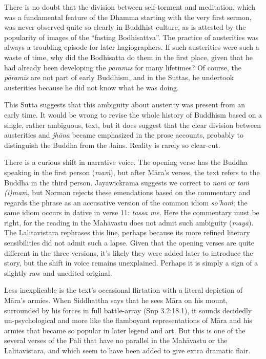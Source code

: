 \documentclass[12pt,openany]{book}%
\begin{document}
There is no doubt that the division between self-torment and meditation, which was a fundamental feature of the Dhamma starting with the very first sermon, was never observed quite so clearly in Buddhist culture, as is attested by the popularity of images of the “fasting Bodhisattva”. The practice of austerities was always a troubling episode for later hagiographers. If such austerities were such a waste of time, why did the Bodhisatta do them in the first place, given that he had already been developing the \textit{\textsanskrit{pāramīs}} for many lifetimes? Of course, the \textit{\textsanskrit{pāramīs}} are not part of early Buddhism, and in the Suttas, he undertook austerities because he did not know what he was doing.

This Sutta suggests that this ambiguity about austerity was present from an early time. It would be wrong to revise the whole history of Buddhism based on a single, rather ambiguous, text, but it does suggest that the clear division between austerities and \textit{\textsanskrit{jhāna}} became emphasized in the prose accounts, probably to distinguish the Buddha from the Jains. Reality is rarely so clear-cut.

There is a curious shift in narrative voice. The opening verse has the Buddha speaking in the first person (\textit{\textsanskrit{maṁ}}), but after \textsanskrit{Māra}’s verses, the text refers to the Buddha in the third person. Jayawickrama suggests we correct to \textit{\textsanskrit{naṁ}} or \textit{\textsanskrit{taṁ} (i)\textsanskrit{maṁ}}, but Norman rejects these emendations based on the commentary and regards the phrase as an accusative version of the common idiom \textit{so’\textsanskrit{haṁ}}; the same idiom occurs in dative in verse 11: \textit{tassa me}. Here the commentary must be right, for the reading in the \textsanskrit{Mahāvastu} does not admit such ambiguity (\textit{\textsanskrit{mayā}}). The Lalitavistara rephrases this line, perhaps because its more refined literary sensibilities did not admit such a lapse. Given that the opening verses are quite different in the three versions, it’s likely they were added later to introduce the story, but the shift in voice remains unexplained. Perhaps it is simply a sign of a slightly raw and unedited original.

Less inexplicable is the text’s occasional flirtation with a literal depiction of \textsanskrit{Māra}’s armies. When Siddhattha says that he sees \textsanskrit{Māra} on his mount, surrounded by his forces in full battle-array (Snp 3.2:18.1), it sounds decidedly un-psychological and more like the flamboyant representations of \textsanskrit{Māra} and his armies that became so popular in later legend and art. But this is one of the several verses of the Pali that have no parallel in the \textsanskrit{Mahāvastu} or the Lalitavistara, and which seem to have been added to give extra dramatic flair.
\end{document}
